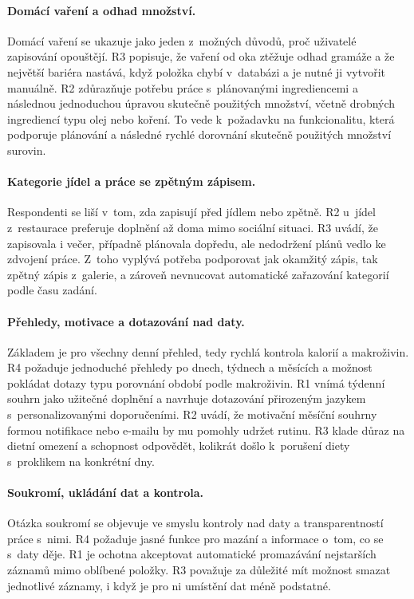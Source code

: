 \paragraph{Domácí vaření a odhad množství.}
Domácí vaření se ukazuje jako jeden z~možných důvodů, proč uživatelé zapisování opouštějí.
R3 popisuje, že vaření od oka ztěžuje odhad gramáže a že největší bariéra nastává, když položka chybí v~databázi a je nutné ji vytvořit manuálně.
R2 zdůrazňuje potřebu práce s~plánovanými ingrediencemi a následnou jednoduchou úpravou skutečně použitých množství, včetně drobných ingrediencí typu olej nebo koření.
To vede k~požadavku na funkcionalitu, která podporuje plánování a následné rychlé dorovnání skutečně použitých množství surovin.

\paragraph{Kategorie jídel a práce se zpětným zápisem.}
Respondenti se liší v~tom, zda zapisují před jídlem nebo zpětně.
R2 u~jídel z~restaurace preferuje doplnění až doma mimo sociální situaci.
R3 uvádí, že zapisovala i večer, případně plánovala dopředu, ale nedodržení plánů vedlo ke zdvojení práce.
Z~toho vyplývá potřeba podporovat jak okamžitý zápis, tak zpětný zápis z~galerie, a zároveň nevnucovat automatické zařazování kategorií podle času zadání.

\paragraph{Přehledy, motivace a dotazování nad daty.}
Základem je pro všechny denní přehled, tedy rychlá kontrola kalorií a makroživin.
R4 požaduje jednoduché přehledy po dnech, týdnech a měsících a možnost pokládat dotazy typu porovnání období podle makroživin.
R1 vnímá týdenní souhrn jako užitečné doplnění a navrhuje dotazování přirozeným jazykem s~personalizovanými doporučeními.
R2 uvádí, že motivační měsíční souhrny formou notifikace nebo e-mailu by mu pomohly udržet rutinu.
R3 klade důraz na dietní omezení a schopnost odpovědět, kolikrát došlo k~porušení diety s~proklikem na konkrétní dny.

\paragraph{Soukromí, ukládání dat a kontrola.}
Otázka soukromí se objevuje ve smyslu kontroly nad daty a transparentností práce s~nimi.
R4 požaduje jasné funkce pro mazání a informace o~tom, co se s~daty děje.
R1 je ochotna akceptovat automatické promazávání nejstarších záznamů mimo oblíbené položky.
R3 považuje za důležité mít možnost smazat jednotlivé záznamy, i když je pro ni umístění dat méně podstatné.

